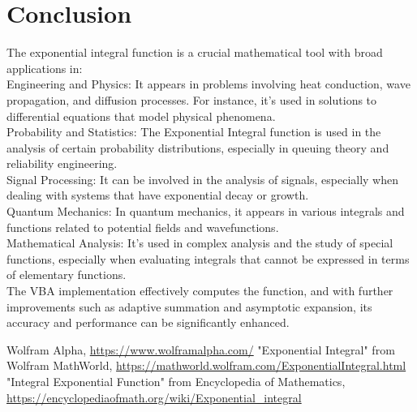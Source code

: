 \documentclass{article}
\begin{document}
\section{Conclusion}
The exponential integral function is a crucial mathematical tool with broad applications in:
\\ Engineering and Physics: It appears in problems involving heat conduction, wave propagation, and diffusion processes. For instance, it's used in solutions to differential equations that model physical phenomena.
\\
Probability and Statistics: The Exponential Integral function is used in the analysis of certain probability distributions, especially in queuing theory and reliability engineering.
\\
Signal Processing: It can be involved in the analysis of signals, especially when dealing with systems that have exponential decay or growth.
\\
Quantum Mechanics: In quantum mechanics, it appears in various integrals and functions related to potential fields and wavefunctions.
\\
Mathematical Analysis: It's used in complex analysis and the study of special functions, especially when evaluating integrals that cannot be expressed in terms of elementary functions. 
\\ The VBA implementation effectively computes the function, and with further improvements such as adaptive summation and asymptotic expansion, its accuracy and performance can be significantly enhanced.

\begin{thebibliography}{9}
     Wolfram Alpha, \url{https://www.wolframalpha.com/}
     "Exponential Integral" from Wolfram MathWorld, \url{https://mathworld.wolfram.com/ExponentialIntegral.html}
     "Integral Exponential Function" from Encyclopedia of Mathematics, \url{https://encyclopediaofmath.org/wiki/Exponential_integral}
\end{thebibliography}
\end{document}
